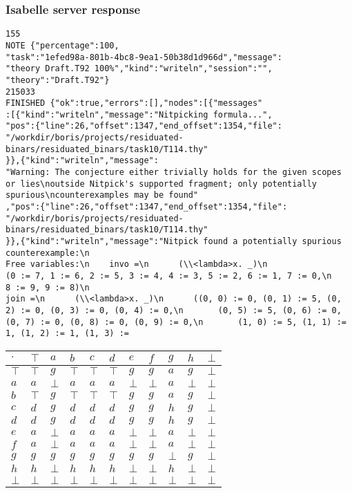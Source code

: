 \documentclass{beamer}
\begin{document}
\begin{frame}[fragile]
\frametitle{Isabelle server response}
\begin{verbatim}
155
NOTE {"percentage":100,
"task":"1efed98a-801b-4bc8-9ea1-50b38d1d966d","message":
"theory Draft.T92 100%","kind":"writeln","session":"",
"theory":"Draft.T92"}
215033
FINISHED {"ok":true,"errors":[],"nodes":[{"messages"
:[{"kind":"writeln","message":"Nitpicking formula...",
"pos":{"line":26,"offset":1347,"end_offset":1354,"file":
"/workdir/boris/projects/residuated-binars/residuated_binars/task10/T114.thy"
}},{"kind":"writeln","message":
"Warning: The conjecture either trivially holds for the given scopes or lies\noutside Nitpick's supported fragment; only potentially spurious\ncounterexamples may be found"
,"pos":{"line":26,"offset":1347,"end_offset":1354,"file":
"/workdir/boris/projects/residuated-binars/residuated_binars/task10/T114.thy"
}},{"kind":"writeln","message":"Nitpick found a potentially spurious counterexample:\n  
Free variables:\n    invo =\n      (\\<lambda>x. _)\n      
(0 := 7, 1 := 6, 2 := 5, 3 := 4, 4 := 3, 5 := 2, 6 := 1, 7 := 0,\n       8 := 9, 9 := 8)\n
join =\n      (\\<lambda>x. _)\n      ((0, 0) := 0, (0, 1) := 5, (0, 2) := 0, (0, 3) := 0, (0, 4) := 0,\n       (0, 5) := 5, (0, 6) := 0, (0, 7) := 0, (0, 8) := 0, (0, 9) := 0,\n       (1, 0) := 5, (1, 1) := 1, (1, 2) := 1, (1, 3) :=
\end{verbatim}
\end{frame}
\begin{frame}
\begin{table}[]
\begin{tabular}{l|llllllllll}
$\cdot$ & $\top$ & $a$ & $b$ & $c$ & $d$ & $e$ & $f$ & $g$ & $h$ & $\bot$\\\hline
$\top$ & $\top$ & $g$ & $\top$ & $\top$ & $\top$ & $g$ & $g$ & $a$ & $g$ & $\bot$\\
$a$ & $a$ & $\bot$ & $a$ & $a$ & $a$ & $\bot$ & $\bot$ & $a$ & $\bot$ & $\bot$\\
$b$ & $\top$ & $g$ & $\top$ & $\top$ & $\top$ & $g$ & $g$ & $a$ & $g$ & $\bot$\\
$c$ & $d$ & $g$ & $d$ & $d$ & $d$ & $g$ & $g$ & $h$ & $g$ & $\bot$\\
$d$ & $d$ & $g$ & $d$ & $d$ & $d$ & $g$ & $g$ & $h$ & $g$ & $\bot$\\
$e$ & $a$ & $\bot$ & $a$ & $a$ & $a$ & $\bot$ & $\bot$ & $a$ & $\bot$ & $\bot$\\
$f$ & $a$ & $\bot$ & $a$ & $a$ & $a$ & $\bot$ & $\bot$ & $a$ & $\bot$ & $\bot$\\
$g$ & $g$ & $g$ & $g$ & $g$ & $g$ & $g$ & $g$ & $\bot$ & $g$ & $\bot$\\
$h$ & $h$ & $\bot$ & $h$ & $h$ & $h$ & $\bot$ & $\bot$ & $h$ & $\bot$ & $\bot$\\
$\bot$ & $\bot$ & $\bot$ & $\bot$ & $\bot$ & $\bot$ & $\bot$ & $\bot$ & $\bot$ & $\bot$ & $\bot$
\end{tabular}
\end{table}
\end{frame}
\end{document}
